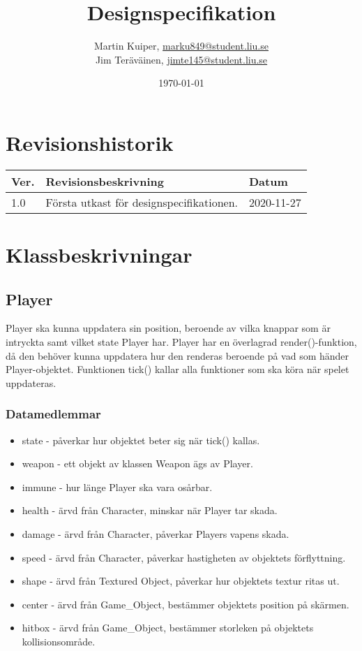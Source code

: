 \documentclass{TDP005mall}
\author{Martin Kuiper, \url{marku849@student.liu.se}\\
  Jim Teräväinen, \url{jimte145@student.liu.se}}
\title{Designspecifikation}
\date{\today}
\begin{document}
\projectpage
\section{Revisionshistorik}
\begin{table}[!h]
\begin{tabularx}{\linewidth}{|l|X|l|}
\hline
Ver. & Revisionsbeskrivning & Datum \\\hline
1.0 & Första utkast för designspecifikationen. & 2020-11-27 \\\hline
\end{tabularx}
\end{table}

\section{Klassbeskrivningar}
\subsection{Player}
Player ska kunna uppdatera sin position, beroende av vilka knappar som är intryckta samt vilket state Player har.
Player har en överlagrad render()-funktion, då den behöver kunna uppdatera hur den renderas beroende på vad som händer Player-objektet.
Funktionen tick() kallar alla funktioner som ska köra när spelet uppdateras. 
\subsubsection{Datamedlemmar}
\begin{itemize}
\item state - påverkar hur objektet beter sig när tick() kallas.
\item weapon - ett objekt av klassen Weapon ägs av Player.
\item immune - hur länge Player ska vara osårbar.
\item health - ärvd från Character, minskar när Player tar skada.
\item damage - ärvd från Character, påverkar Players vapens skada.
\item speed - ärvd från Character, påverkar hastigheten av objektets förflyttning.
\item shape - ärvd från Textured Object, påverkar hur objektets textur ritas ut.
\item center - ärvd från Game\_Object, bestämmer objektets position på skärmen.
\item hitbox - ärvd från Game\_Object, bestämmer storleken på objektets kollisionsområde.
\end{itemize}
\end{document}
